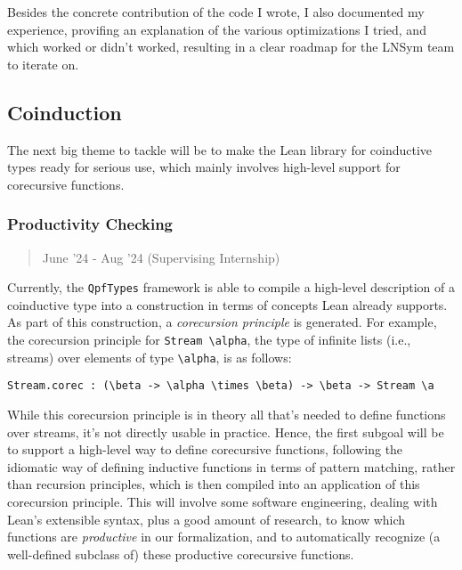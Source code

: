 \documentclass[a4paper]{scrartcl}
\begin{document}
Besides the concrete contribution of the code I wrote, I also documented my experience,
provifing an explanation of the various optimizations I tried, and which worked or didn't worked,
resulting in a clear roadmap for the LNSym team to iterate on.

\subsection{Coinduction}\label{coinduction}

The next big theme to tackle will be to make the Lean library for
coinductive types ready for serious use, which mainly involves
high-level support for corecursive functions.


\subsubsection{Productivity Checking}\label{productivity-checking}

\begin{quote}
June '24 - Aug '24 (Supervising Internship)
\end{quote}

Currently, the \texttt{QpfTypes} framework is able to compile a
high-level description of a coinductive type into a construction in
terms of concepts Lean already supports. As part of this construction, a
\emph{corecursion principle} is generated. For example, the corecursion
principle for \texttt{Stream\ \textbackslash{}alpha}, the type of
infinite lists (i.e., streams) over elements of type
\texttt{\textbackslash{}alpha}, is as follows:

\begin{verbatim}
Stream.corec : (\beta -> \alpha \times \beta) -> \beta -> Stream \a
\end{verbatim}

While this corecursion principle is in theory all that's needed to
define functions over streams, it's not directly usable in practice.
Hence, the first subgoal will be to support a high-level way to define
corecursive functions, following the idiomatic way of defining inductive
functions in terms of pattern matching, rather than recursion
principles, which is then compiled into an application of this
corecursion principle. This will involve some software engineering,
dealing with Lean's extensible syntax, plus a good amount of research,
to know which functions are \emph{productive} in our formalization, and
to automatically recognize (a well-defined subclass of) these
productive corecursive functions.
\end{document}
